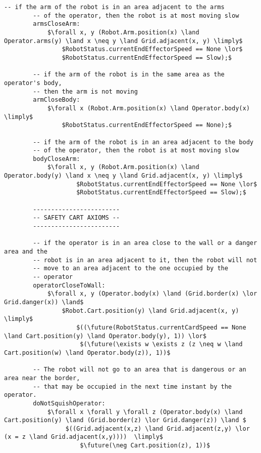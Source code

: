 \begin{lstlisting}[fontadjust, mathescape, frame=single]
        -- if the arm of the robot is in an area adjacent to the arms
        -- of the operator, then the robot is at most moving slow
        armsCloseArm:
            $\forall x, y (Robot.Arm.position(x) \land Operator.arms(y) \land x \neq y \land Grid.adjacent(x, y) \limply$
                $RobotStatus.currentEndEffectorSpeed == None \lor$
                $RobotStatus.currentEndEffectorSpeed == Slow);$

        -- if the arm of the robot is in the same area as the operator's body,
        -- then the arm is not moving
        armCloseBody:
            $\forall x (Robot.Arm.position(x) \land Operator.body(x) \limply$
                $RobotStatus.currentEndEffectorSpeed == None);$

        -- if the arm of the robot is in an area adjacent to the body
        -- of the operator, then the robot is at most moving slow
        bodyCloseArm:
            $\forall x, y (Robot.Arm.position(x) \land Operator.body(y) \land x \neq y \land Grid.adjacent(x, y) \limply$
                    $RobotStatus.currentEndEffectorSpeed == None \lor$
                    $RobotStatus.currentEndEffectorSpeed == Slow);$

        ------------------------       
        -- SAFETY CART AXIOMS --
        ------------------------

        -- if the operator is in an area close to the wall or a danger area and the
        -- robot is in an area adjacent to it, then the robot will not
        -- move to an area adjacent to the one occupied by the
        -- operator
        operatorCloseToWall:
            $\forall x, y (Operator.body(x) \land (Grid.border(x) \lor Grid.danger(x)) \land$
                $Robot.Cart.position(y) \land Grid.adjacent(x, y) \limply$
                    $((\future(RobotStatus.currentCardSpeed == None \land Cart.position(y) \land Operator.body(y), 1)) \lor$
                     $(\future(\exists w \exists z (z \neq w \land Cart.position(w) \land Operator.body(z)), 1))$    

        -- The robot will not go to an area that is dangerous or an area near the border,
        -- that may be occupied in the next time instant by the operator.
        doNotSquishOperator:
            $\forall x \forall y \forall z (Operator.body(x) \land Cart.position(y) \land (Grid.border(z) \lor Grid.danger(z)) \land $
                 $((Grid.adjacent(x,z) \land Grid.adjacent(z,y) \lor (x = z \land Grid.adjacent(x,y))))  \limply$
                     $\future(\neg Cart.position(z), 1))$


\end{lstlisting}
